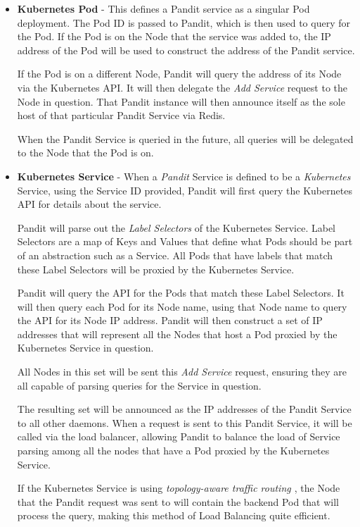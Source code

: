 \documentclass[a4paper,12pt]{report}
\begin{document}
\begin{itemize}
    \item \textbf{Kubernetes Pod} - This defines a Pandit service as a singular Pod deployment. The Pod ID is passed to Pandit, which is then used to query for the Pod. If the Pod is on the Node that the service was added to, the IP address of the Pod will be used to construct the address of the Pandit service.
    
    If the Pod is on a different Node, Pandit will query the address of its Node via the Kubernetes API. It will then delegate the \textit{Add Service} request to the Node in question. That Pandit instance will then announce itself as the sole host of that particular Pandit Service via Redis.
    
    When the Pandit Service is queried in the future, all queries will be delegated to the Node that the Pod is on.
    
    \item \textbf{Kubernetes Service} - When a \textit{Pandit} Service is defined to be a \textit{Kubernetes} Service, using the Service ID provided, Pandit will first query the Kubernetes API for details about the service.
    
    Pandit will parse out the \textit{Label Selectors} of the Kubernetes Service. Label Selectors are a map of Keys and Values that define what Pods should be part of an abstraction such as a Service. 
    All Pods that have labels that match these Label Selectors will be proxied by the Kubernetes Service. 
    
    Pandit will query the API for the Pods that match these Label Selectors. It will then query each Pod for its Node name, using that Node name to query
    the API for its Node IP address. Pandit will then construct a set of IP addresses that will represent all the Nodes that host a Pod proxied by the Kubernetes Service in question.
    
    All Nodes in this set will be sent this \textit{Add Service} request, ensuring they are all capable of parsing queries for the Service in question.
    
    The resulting set will be announced as the IP addresses of the Pandit Service to all other daemons. When a request is sent to this Pandit Service,
    it will be called via the load balancer, allowing Pandit to balance the load of Service parsing among all the nodes that have a Pod proxied by the Kubernetes Service. 
    
    If the Kubernetes Service is using \textit{topology-aware traffic routing \cite{k8s_topology}}, the Node that the Pandit request was sent to will contain the backend Pod that will process the query, making this method of Load Balancing quite efficient. 
    

\end{itemize}
\end{document}
